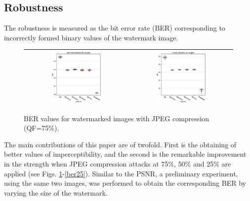\documentclass[runningheads]{llncs}
\begin{document}
\subsection{Robustness}
The robustness is measured as the bit error rate (BER) corresponding to incorrectly formed binary values of the watermark image.
\begin{figure}[H]
	\begin{center}
		\begin{tabular}{|c|c|}\hline
			\includegraphics[width=0.5\textwidth]{BER75SaintGall.eps}
			&\includegraphics[width=0.5\textwidth]{BER75Parzival.eps}\\\hline
		\end{tabular}
	\end{center}
	\caption{BER values for watermarked images with JPEG compression (QF=75\%).}
	\label{ber75}
\end{figure}
The main contributions of this paper are of twofold. First is the obtaining of better values of imperceptibility, and the second is the remarkable improvement in the strength when JPEG compression attacks at 75\%, 50\% and 25\% are applied (see Figs. \ref{ber75}-\ref{ber25}). Similar to the PSNR, a preliminary experiment, using the same two images, was performed to obtain the corresponding BER by varying the size of the watermark.
\end{document}
